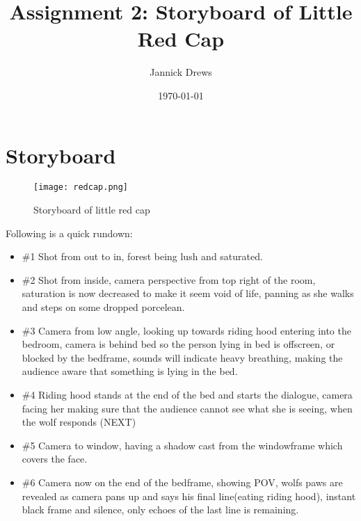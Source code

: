 \documentclass{article}
\title{Assignment 2: Storyboard of Little Red Cap}
\author{Jannick Drews}
\date{\today}
\begin{document}
\maketitle
\newpage

\section{Storyboard}
\begin{figure}[H]
    \centering
    \texttt{[image: redcap.png]}
    \caption{Storyboard of little red cap}
    \label{fig:redcap}
\end{figure}
Following is a quick rundown:\\
\begin{itemize}
    \item \#1 Shot from out to in, forest being lush and saturated.
    \item \#2 Shot from inside, camera perspective from top right of the room, saturation is now decreased to make it seem void of life, panning as she walks and steps on some dropped porcelean.
    \item \#3 Camera from low angle, looking up towards riding hood entering into the bedroom, camera is behind bed so the person lying in bed is offscreen, or blocked by the bedframe, sounds will indicate heavy breathing, making the audience aware that something is lying in the bed.
    \item \#4 Riding hood stands at the end of the bed and starts the dialogue, camera facing her making sure that the audience cannot see what she is seeing, when the wolf responds (NEXT)
    \item \#5 Camera to window, having a shadow cast from the windowframe which covers the face.
    \item \#6 Camera now on the end of the bedframe, showing POV, wolfs paws are revealed as camera pans up and says his final line(eating riding hood), instant black frame and silence, only echoes of the last line is remaining.
\end{itemize}
\end{document}
